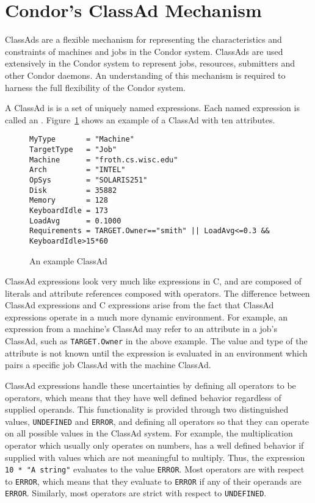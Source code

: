 \section{\label{classad-reference}
Condor's ClassAd Mechanism}

\label{sec:classadref}
ClassAds are a flexible mechanism for representing the characteristics and
constraints of machines and jobs in the Condor system.  ClassAds are used
extensively in the Condor system to represent jobs, resources, submitters
and other Condor daemons.  An understanding of this mechanism is required
to harness the full flexibility of the Condor system.

A ClassAd is is a set of uniquely named expressions.  Each named expression
is called an .  Figure~\ref{ClassAd:example} shows an example 
of a ClassAd with ten attributes.

\begin{figure}[hbt]
\footnotesize
\begin{verbatim}
MyType       = "Machine"
TargetType   = "Job"
Machine      = "froth.cs.wisc.edu"
Arch         = "INTEL"
OpSys        = "SOLARIS251"
Disk         = 35882
Memory       = 128
KeyboardIdle = 173
LoadAvg      = 0.1000
Requirements = TARGET.Owner=="smith" || LoadAvg<=0.3 && KeyboardIdle>15*60
\end{verbatim}
\normalsize
\caption{\label{ClassAd:example}An example ClassAd}
\end{figure}

ClassAd expressions look very much like expressions in C, and are composed
of literals and attribute references composed with operators.  The difference
between ClassAd expressions and C expressions arise from the fact that ClassAd
expressions operate in a much more dynamic environment.  For example, an
expression from a machine's ClassAd may refer to an attribute in a job's 
ClassAd, such as \verb+TARGET.Owner+ in the above example.  The value and type 
of the attribute is not known until the expression is evaluated in an 
environment which pairs a specific job ClassAd with the machine ClassAd.

ClassAd expressions handle these uncertainties by defining all operators
to be  operators, which means that they have well defined
behavior regardless of supplied operands.  This functionality is provided
through two distinguished values, \texttt{UNDEFINED} and \texttt{ERROR},
and defining all operators so that they can operate on all possible values
in the ClassAd system.  For example, the multiplication operator which usually
only operates on numbers, has a well defined behavior if supplied with values
which are not meaningful to multiply.  Thus, the expression 
\verb+10 * "A string"+ evaluates to the value \texttt{ERROR}.  Most operators
are  with respect to \texttt{ERROR}, which means that they evaluate
to \texttt{ERROR} if any of their operands are \texttt{ERROR}.  Similarly,
most operators are strict with respect to \texttt{UNDEFINED}.

